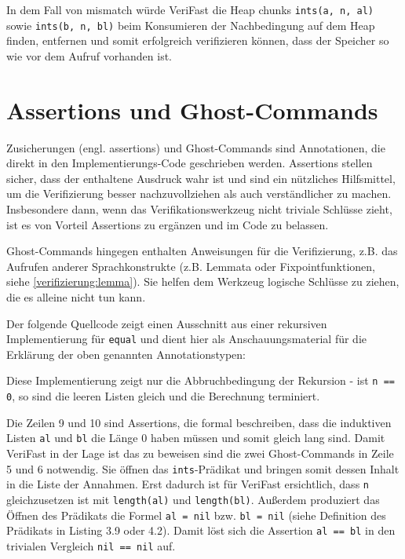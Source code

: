 In dem Fall von mismatch würde VeriFast die Heap chunks \lstinline{ints(a, n, al)} sowie
\lstinline{ints(b, n, bl)} beim Konsumieren der Nachbedingung auf dem Heap finden, entfernen und
somit erfolgreich verifizieren können, dass der Speicher so wie vor dem Aufruf vorhanden ist.



\section{Assertions und Ghost-Commands}

Zusicherungen (engl. assertions) und Ghost-Commands sind Annotationen, die direkt in den Implementierungs-Code
geschrieben werden. Assertions stellen sicher, dass der enthaltene Ausdruck wahr ist und sind ein nützliches Hilfsmittel, 
um die Verifizierung besser nachzuvollziehen als auch verständlicher zu machen. Insbesondere dann, wenn das Verifikationswerkzeug 
nicht triviale Schlüsse zieht, ist es von Vorteil Assertions zu ergänzen und im Code zu belassen.

Ghost-Commands hingegen enthalten Anweisungen für die Verifizierung, z.B. das Aufrufen anderer Sprachkonstrukte 
(z.B. Lemmata oder Fixpointfunktionen, siehe \ref{verifizierung:lemma}). Sie helfen dem Werkzeug logische Schlüsse 
zu ziehen, die es alleine nicht tun kann.

Der folgende Quellcode zeigt einen Ausschnitt aus einer rekursiven Implementierung für \lstinline{equal} und dient
hier als Anschauungsmaterial für die Erklärung der oben genannten Annotationstypen:



Diese Implementierung zeigt nur die Abbruchbedingung der Rekursion - ist \lstinline{n == 0}, so sind die
leeren Listen gleich und die Berechnung terminiert. 

Die Zeilen 9 und 10 sind Assertions, die formal beschreiben, dass die induktiven Listen \lstinline{al} und
\lstinline{bl} die Länge 0 haben müssen und somit gleich lang sind. Damit VeriFast in der Lage ist das zu
beweisen sind die zwei Ghost-Commands in Zeile 5 und 6 notwendig. Sie öffnen das \lstinline{ints}-Prädikat
und bringen somit dessen Inhalt in die Liste der Annahmen. Erst dadurch ist für VeriFast ersichtlich, dass 
\lstinline{n} gleichzusetzen ist mit \texttt{length(al)} und \texttt{length(bl)}. Außerdem produziert
das Öffnen des Prädikats die Formel \lstinline{al = nil} bzw. \lstinline{bl = nil} (siehe Definition
des Prädikats in Listing 3.9 oder 4.2). Damit löst sich die Assertion \lstinline{al == bl} in den
trivialen Vergleich \lstinline{nil == nil} auf.

